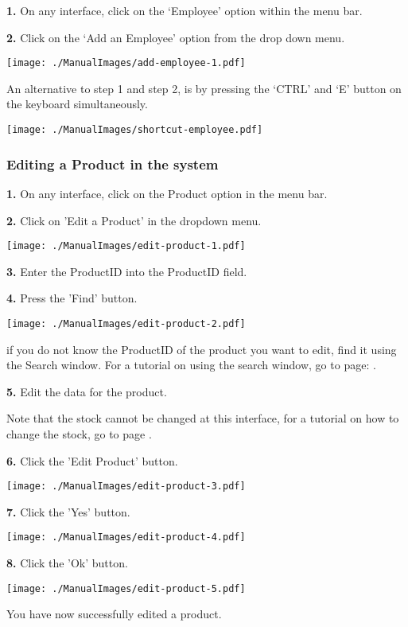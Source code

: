 \textbf{1.} On any interface, click on the `Employee' option within the menu bar.

\textbf{2.} Click on the `Add an Employee' option from the drop down menu.

\texttt{[image: ./ManualImages/add-employee-1.pdf]}

An alternative to step 1 and step 2, is by pressing the `CTRL' and `E' button on the keyboard simultaneously.

\texttt{[image: ./ManualImages/shortcut-employee.pdf]}

\pagebreak
\subsubsection{Editing a Product in the system}
\label{fig:Editing a Product in the system}

\textbf{1.} On any interface, click on the Product option in the menu bar.

\textbf{2.} Click on 'Edit a Product' in the dropdown menu.

\texttt{[image: ./ManualImages/edit-product-1.pdf]}

\textbf{3.} Enter the ProductID into the ProductID field. 

\textbf{4.} Press the 'Find' button.

\texttt{[image: ./ManualImages/edit-product-2.pdf]}

if you do not know the ProductID of the product you want to edit, find it using the Search window. For a tutorial on using the search window, go to page: . 

\textbf{5.} Edit the data for the product.

Note that the stock cannot be changed at this interface, for a tutorial on how to change the stock, go to page .

\textbf{6.} Click the 'Edit Product' button.

\texttt{[image: ./ManualImages/edit-product-3.pdf]}

\textbf{7.} Click the 'Yes' button.

\texttt{[image: ./ManualImages/edit-product-4.pdf]}

\textbf{8.} Click the 'Ok' button.

\texttt{[image: ./ManualImages/edit-product-5.pdf]}

You have now successfully edited a product.


